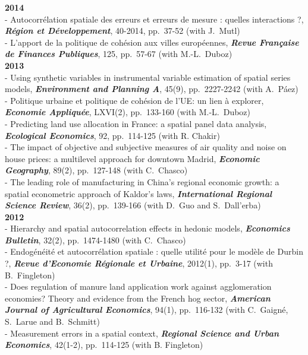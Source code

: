 \documentclass[a4paper,12pt]{article}
\begin{document}
\noindent \textbf{2014}  \smallskip \\ 
- Autocorrélation spatiale des erreurs et erreurs de mesure : quelles interactions ?, \textit{\textbf{Région et Développement}}, 40-2014, pp.~37-52 (with J.~Mutl) \\
- L'apport de la politique de cohésion aux villes européennes, \textit{\textbf{Revue Fran\c caise de Finances Publiques}}, 125, pp.~57-67 (with M.-L.~Duboz) \\

\noindent \textbf{2013}  \smallskip \\ 
- Using synthetic variables in instrumental variable estimation of spatial series models, \textit{\textbf{Environment and Planning A}}, 45(9), pp.~2227-2242 (with A.~Páez) \\
- Politique urbaine et politique de cohésion de l'UE: un lien à explorer, \textit{\textbf{Economie Appliquée}}, LXVI(2), pp.~133-160 (with M.-L.~Duboz) \\
- Predicting land use allocation in France: a spatial panel data analysis, \textit{\textbf{Ecological Economics}}, 92, pp.~114-125 (with R. Chakir) \\
- The impact of objective and subjective measures of air quality and noise on house prices: a multilevel approach for downtown Madrid, \textit{\textbf{Economic Geography}}, 89(2), pp.~127-148 (with C.~Chasco) \\
- The leading role of manufacturing in China's regional economic growth: a spatial econometric approach of Kaldor's laws, \textit{\textbf{International Regional Science Review}}, 36(2), pp.~139-166 (with D.~Guo and S.~Dall'erba) \\

\noindent \textbf{2012}  \smallskip \\ 
- Hierarchy and spatial autocorrelation effects in hedonic models, \textit{\textbf{Economics Bulletin}}, 32(2), pp.~1474-1480 (with C.~Chasco) \\
- Endogénéité et autocorrélation spatiale : quelle utilité pour le modèle de Durbin ?, \textit{\textbf{Revue d'Economie Régionale et Urbaine}}, 2012(1), pp.~3-17 (with B.~Fingleton) \\
- Does regulation of manure land application work against agglomeration economies? Theory and evidence from the French hog sector, \textit{\textbf{American Journal of Agricultural Economics}}, 94(1), pp.~116-132 (with C.~Gaigné, S.~Larue and B.~Schmitt) \\
- Measurement errors in a spatial context, \textit{\textbf{Regional Science and Urban Economics}}, 42(1-2), pp.~114-125 (with B. Fingleton) \\
\end{document}
